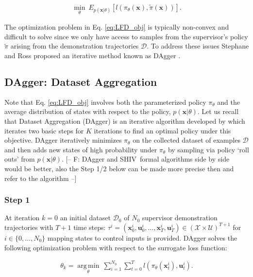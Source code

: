 \documentclass[10pt, conference]{ieeeconf}      %
\DeclareMathOperator*{\argmin}{arg\,min}
\newcommand{\bu}{\mathbf{u}}
\newcommand{\bx}{\mathbf{x}}
\newcommand{\acro}{SHIV}
\begin{document}
 \vspace{-2ex}
\begin{align}\label{eq:LFD_obj}
\underset{\theta}{\min} \: E_{p(\bx|\theta)} [l(\pi_\theta(\bx),\tilde{\pi}(\bx))].
\end{align}
 
The optimization problem in Eq. \ref{eq:LFD_obj} is typically non-convex and difficult to solve since we only have
access to samples from the supervisor's policy $\tilde{\pi}$ arising from the demonstration trajectories $\mathcal{D}$. To address these issues Stephane and Ross proposed an iterative method known as DAgger \cite{ross2010reduction}.

 \subsection{DAgger: Dataset Aggregation}
Note that Eq. \ref{eq:LFD_obj} involves both the parameterized policy $\pi_{\theta}$ and the average distribution of
states with respect to the policy, $p(\bx|\theta)$. Let us recall that Dataset Aggregation (DAgger) is an iterative algorithm developed by \cite{ross2010reduction} which iterates two basic steps for $K$ iterations to find an optimal policy under this objective. 
DAgger iteratively minimizes $\pi_{\theta}$ on the collected dataset of examples $\mathcal{D}$ and then adds new states
of high probability under $\pi_\theta$ by sampling via policy `roll outs' from $p(\bx|\theta)$. 
{\color{blue} [-- F: DAgger and \acro~formal algorithms side by side would be better, also the Step 1/2 below can be
made more precise then and refer to the algorithm --]}

\subsubsection{Step 1}
At iteration $k=0$ an initial dataset $\mathcal{D}_0$ of $N_0$ supervisor demonstration trajectories 
with $T+1$ time steps: $\tau^i=(\bx_0^i, \bu_0^i, \ldots, \bx_T^i, \bu_T^i)\in (\mathcal{X}\times\mathcal{U})^{T+1}$ for $i\in \{0, \ldots, N_0\}$
mapping states to control
inputs is provided. DAgger solves the following optimization problem with respect to the surrogate loss function:

 \vspace{-2ex}
\begin{align}\label{eq:super_objj}
\theta_{k} = \underset{\theta}{\argmin} \: \sum_{i=1}^{N_0}\sum_{t=0}^T l(\pi_{\theta}(\bx_t^{i}),\bu_{t}^i).
\end{align}
\end{document}
